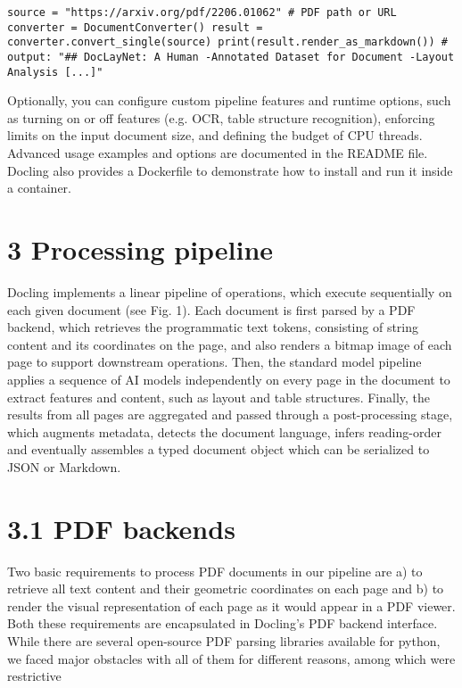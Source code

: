 \documentclass[11pt,a4paper]{article}
\begin{document}
\begin{verbatim}
source = "https://arxiv.org/pdf/2206.01062" # PDF path or URL converter = DocumentConverter() result = converter.convert_single(source) print(result.render_as_markdown()) # output: "## DocLayNet: A Human -Annotated Dataset for Document -Layout Analysis [...]"
\end{verbatim}

Optionally, you can configure custom pipeline features and runtime options, such as turning on or off features (e.g. OCR, table structure recognition), enforcing limits on the input document size, and defining the budget of CPU threads. Advanced usage examples and options are documented in the README file. Docling also provides a Dockerfile to demonstrate how to install and run it inside a container.

\section{3 Processing pipeline}

Docling implements a linear pipeline of operations, which execute sequentially on each given document (see Fig. 1). Each document is first parsed by a PDF backend, which retrieves the programmatic text tokens, consisting of string content and its coordinates on the page, and also renders a bitmap image of each page to support downstream operations. Then, the standard model pipeline applies a sequence of AI models independently on every page in the document to extract features and content, such as layout and table structures. Finally, the results from all pages are aggregated and passed through a post-processing stage, which augments metadata, detects the document language, infers reading-order and eventually assembles a typed document object which can be serialized to JSON or Markdown.

\section{3.1 PDF backends}

Two basic requirements to process PDF documents in our pipeline are a) to retrieve all text content and their geometric coordinates on each page and b) to render the visual representation of each page as it would appear in a PDF viewer. Both these requirements are encapsulated in Docling's PDF backend interface. While there are several open-source PDF parsing libraries available for python, we faced major obstacles with all of them for different reasons, among which were restrictive
\end{document}

